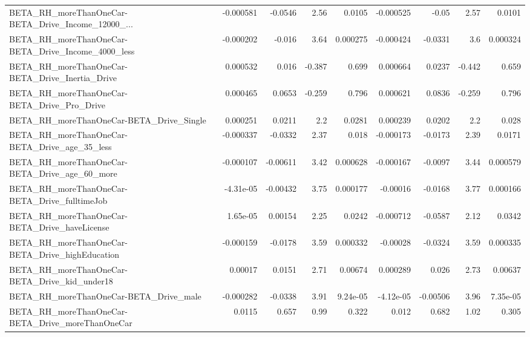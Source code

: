 \begin{tabular}{lrrrrrrrr}
BETA\_RH\_moreThanOneCar-BETA\_Drive\_Income\_12000\_... &   -0.000581 &      -0.0546 &     2.56 &   0.0105 &  -0.000525 &       -0.05 &         2.57 &        0.0101 \\
BETA\_RH\_moreThanOneCar-BETA\_Drive\_Income\_4000\_less &   -0.000202 &       -0.016 &     3.64 & 0.000275 &  -0.000424 &     -0.0331 &          3.6 &      0.000324 \\
BETA\_RH\_moreThanOneCar-BETA\_Drive\_Inertia\_Drive    &    0.000532 &        0.016 &   -0.387 &    0.699 &   0.000664 &      0.0237 &       -0.442 &         0.659 \\
BETA\_RH\_moreThanOneCar-BETA\_Drive\_Pro\_Drive        &    0.000465 &       0.0653 &   -0.259 &    0.796 &   0.000621 &      0.0836 &       -0.259 &         0.796 \\
BETA\_RH\_moreThanOneCar-BETA\_Drive\_Single           &    0.000251 &       0.0211 &      2.2 &   0.0281 &   0.000239 &      0.0202 &          2.2 &         0.028 \\
BETA\_RH\_moreThanOneCar-BETA\_Drive\_age\_35\_less      &   -0.000337 &      -0.0332 &     2.37 &    0.018 &  -0.000173 &     -0.0173 &         2.39 &        0.0171 \\
BETA\_RH\_moreThanOneCar-BETA\_Drive\_age\_60\_more      &   -0.000107 &     -0.00611 &     3.42 & 0.000628 &  -0.000167 &     -0.0097 &         3.44 &      0.000579 \\
BETA\_RH\_moreThanOneCar-BETA\_Drive\_fulltimeJob      &   -4.31e-05 &     -0.00432 &     3.75 & 0.000177 &   -0.00016 &     -0.0168 &         3.77 &      0.000166 \\
BETA\_RH\_moreThanOneCar-BETA\_Drive\_haveLicense      &    1.65e-05 &      0.00154 &     2.25 &   0.0242 &  -0.000712 &     -0.0587 &         2.12 &        0.0342 \\
BETA\_RH\_moreThanOneCar-BETA\_Drive\_highEducation    &   -0.000159 &      -0.0178 &     3.59 & 0.000332 &   -0.00028 &     -0.0324 &         3.59 &      0.000335 \\
BETA\_RH\_moreThanOneCar-BETA\_Drive\_kid\_under18      &     0.00017 &       0.0151 &     2.71 &  0.00674 &   0.000289 &       0.026 &         2.73 &       0.00637 \\
BETA\_RH\_moreThanOneCar-BETA\_Drive\_male             &   -0.000282 &      -0.0338 &     3.91 & 9.24e-05 &  -4.12e-05 &    -0.00506 &         3.96 &      7.35e-05 \\
BETA\_RH\_moreThanOneCar-BETA\_Drive\_moreThanOneCar   &      0.0115 &        0.657 &     0.99 &    0.322 &      0.012 &       0.682 &         1.02 &         0.305 \\

\end{tabular}
